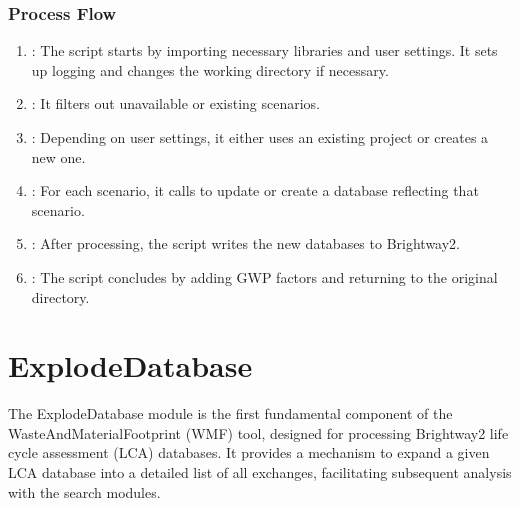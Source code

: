 \documentclass[letterpaper,10pt,english]{sphinxmanual}
\begin{document}
\subsubsection{Process Flow}
\label{\detokenize{FutureScenarios:process-flow}}\begin{enumerate}
%
\item {} 
\sphinxAtStartPar
{}: The script starts by importing necessary libraries and user settings. It sets up logging and changes the working directory if necessary.

\item {} 
\sphinxAtStartPar
{}: It filters out unavailable or existing scenarios.

\item {} 
\sphinxAtStartPar
{}: Depending on user settings, it either uses an existing project or creates a new one.

\item {} 
\sphinxAtStartPar
{}: For each scenario, it calls  to update or create a database reflecting that scenario.

\item {} 
\sphinxAtStartPar
{}: After processing, the script writes the new databases to Brightway2.

\item {} 
\sphinxAtStartPar
{}: The script concludes by adding GWP factors and returning to the original directory.

\end{enumerate}

\sphinxstepscope


\section{ExplodeDatabase}
\label{\detokenize{ExplodeDatabase:explodedatabase}}\label{\detokenize{ExplodeDatabase::doc}}
\sphinxAtStartPar
The ExplodeDatabase module is the first fundamental component of the WasteAndMaterialFootprint (WMF) tool, designed for
processing Brightway2 life cycle assessment (LCA) databases. It provides a mechanism to expand a given LCA database
into a detailed list of all exchanges, facilitating subsequent analysis with the search modules.
\end{document}
